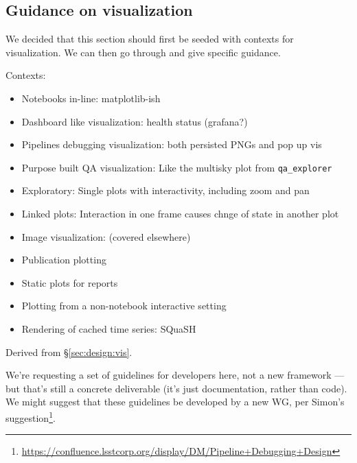 \subsection{Guidance on visualization}

We decided that this section should first be seeded with contexts for visualization. We can then go through and give specific guidance.

Contexts:
\begin{itemize}
\item Notebooks in-line: matplotlib-ish
\item Dashboard like visualization: health status (grafana?)
\item Pipelines debugging visualization: both persisted PNGs and pop up vis
\item Purpose built QA visualization: Like the multisky plot from \texttt{qa\_explorer}
\item Exploratory: Single plots with interactivity, including zoom and pan
\item Linked plots: Interaction in one frame causes chnge of state in another plot
\item Image visualization: (covered elsewhere)
\item Publication plotting
\item Static plots for reports
\item Plotting from a non-notebook interactive setting
\item Rendering of cached time series: SQuaSH
\end{itemize}

Derived from \S\ref{sec:design:vis}.

We're requesting a set of guidelines for developers here, not a new framework
--- but that's still a concrete deliverable (it's just documentation, rather
than code). We might suggest that these guidelines be developed by a new WG,
per Simon's
suggestion\footnote{\url{https://confluence.lsstcorp.org/display/DM/Pipeline+Debugging+Design}}.
